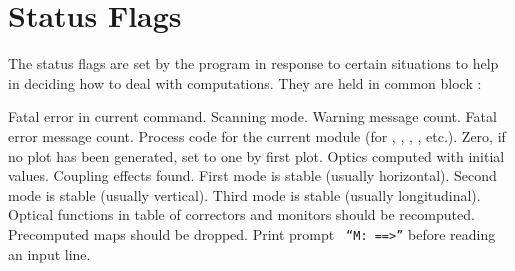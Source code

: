 \section{Status Flags}
\label{Sstat}
The status flags are set by the program in response to certain
situations to help in deciding how to deal with computations.
They are held in common block :
\begin{mylist}
Fatal error in current command.
Scanning mode.
Warning message count.
Fatal error message count.
Process code for the current module (for ,
, , , etc.).
Zero, if no plot has been generated, set to one by first plot.
Optics computed with initial values.
Coupling effects found.
First mode is stable (usually horizontal).
Second mode is stable (usually vertical).
Third mode is stable (usually longitudinal).
Optical functions in table of correctors and monitors should be
recomputed.
Precomputed maps should be dropped.
Print prompt {\tt \ ``M: ==>''} before reading an input line.
\end{mylist}

